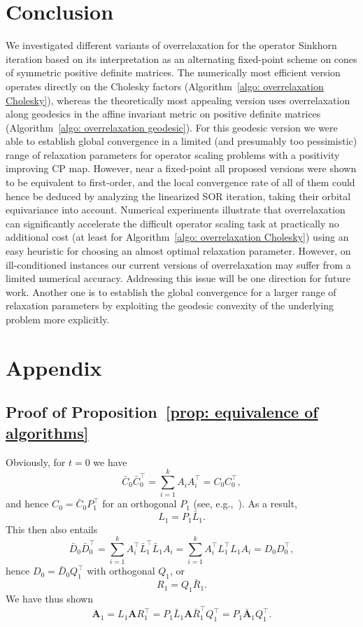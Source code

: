 \documentclass[a4paper]{article}
\newcommand{\bA}{\mathbf{A}}
\theoremstyle{definition}
\numberwithin{equation}{section}
\begin{document}
\section{Conclusion}\label{sec: conclusion}
We investigated different variants of overrelaxation for the operator Sinkhorn iteration based on its interpretation as an alternating fixed-point scheme on cones of symmetric positive definite matrices. The numerically most efficient version operates directly on the Cholesky factors (Algorithm~\ref{algo: overrelaxation Cholesky}), whereas the theoretically most appealing version uses overrelaxation along geodesics in the affine invariant metric on positive definite matrices (Algorithm~\ref{algo: overrelaxation geodesic}). For this geodesic version we were able to establish global convergence in a limited (and presumably too pessimistic) range of relaxation parameters for operator scaling problems with a positivity improving CP map. However, near a fixed-point all proposed versions were shown to be equivalent to first-order, and the local convergence rate of all of them could hence be deduced by analyzing the linearized SOR iteration, taking their orbital equivariance into account. Numerical experiments illustrate that overrelaxation can significantly accelerate the difficult operator scaling task at practically no additional cost (at least for Algorithm~\ref{algo: overrelaxation Cholesky}) using an easy heuristic for choosing an almost optimal relaxation parameter. However, on ill-conditioned instances our current versions of overrelaxation may suffer from a limited numerical accuracy. Addressing this issue will be one direction for future work. Another one is to establish the global convergence for a larger range of relaxation parameters by exploiting the geodesic convexity of the underlying problem more explicitly.

\appendix
\section{Appendix}

\subsection{Proof of Proposition~\ref{prop: equivalence of algorithms}}\label{sec: proof proposition}

Obviously, for $t=0$ we have
\[
 \bar C_0^{} \bar C_0^\top = \sum_{i=1}^k A_i^{} A_i^\top = C_0^{} C_0^\top,
\]
and hence $C_0 = \bar C_0^{} P_1^\top$ for an orthogonal $P_1$ (see, e.g.,~\cite[Lemma~2.1]{Burer2005}). As a result,
\[
 L_1 = P_1 \bar L_1.
\]
This then also entails
\[
 \bar D_0^{} \bar D_0^\top = \sum_{i=1}^k A_i^\top \bar L_1^\top \bar L_1^{} A_i = \sum_{i=1}^k A_i^\top L_1^\top L_1^{} A_i = D_0^{} D_0^\top,
\]
hence $D_0 = \bar D_0^{} Q_1^\top$ with orthogonal $Q_1$, or
\[
 R_1 = Q_1 \bar R_1.
\]
We have thus shown
\[
 \bA_1 = L_1 \bA R_1^\top = P_1 \bar L_1 \bA \bar R_1^\top Q_1^\top = P_1 \bar{\bA}_1 Q_1^\top.
\]
\end{document}
